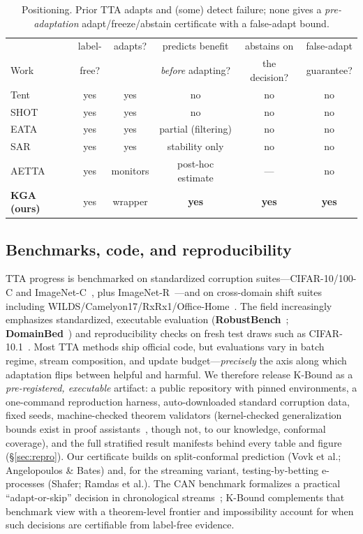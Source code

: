 \documentclass[conference]{IEEEtran}
\theoremstyle{plain}
\theoremstyle{definition}
\begin{document}
\begin{table}[t]\centering\small
{%
\begin{tabular}{lccccc}
\toprule
 & label- & adapts? & predicts benefit & abstains on & false-adapt \\
Work & free? & & \emph{before} adapting? & the decision? & guarantee? \\
\midrule
Tent & yes & yes & no & no & no \\
SHOT & yes & yes & no & no & no \\
EATA & yes & yes & partial (filtering) & no & no \\
SAR & yes & yes & stability only & no & no \\
AETTA & yes & monitors & post-hoc estimate & --- & no \\
\textbf{KGA (ours)} & yes & wrapper & \textbf{yes} & \textbf{yes} & \textbf{yes} \\
\bottomrule
\end{tabular}}
\caption{Positioning. Prior TTA adapts and (some) detect failure; none gives a
\emph{pre-adaptation} adapt/freeze/abstain certificate with a false-adapt bound.}
\label{tab:rel}
\end{table}

\subsection{Benchmarks, code, and reproducibility}
TTA progress is benchmarked on standardized corruption suites---CIFAR-10/100-C and
ImageNet-C~\cite{hendrycks2019cifar10c}, plus ImageNet-R~\cite{hendrycks2021manyfaces}---and on
cross-domain shift suites including WILDS/Camelyon17/RxRx1/Office-Home~\cite{koh2021wilds,bandi2019camelyon,taylor2019rxrx1,venkateswara2017officehome}.
The field increasingly emphasizes standardized, executable evaluation
(\textbf{RobustBench}~\cite{croce2021robustbench}; \textbf{DomainBed}~\cite{gulrajani2021domainbed}) and
reproducibility checks on fresh test draws such as CIFAR-10.1~\cite{recht2019cifar10}. Most TTA
methods ship official code, but evaluations vary in batch regime, stream composition, and update
budget---\emph{precisely} the axis along which adaptation flips between helpful and harmful. We
therefore release K-Bound as a \emph{pre-registered, executable} artifact: a public repository
with pinned environments, a one-command reproduction harness, auto-downloaded standard corruption
data, fixed seeds, machine-checked theorem validators (kernel-checked generalization bounds exist in proof assistants~\cite{zhang2025leanrademacher}, though not, to our knowledge, conformal coverage), and the full stratified result manifests
behind every table and figure (\S\ref{sec:repro}). Our certificate builds on split-conformal
prediction (Vovk et al.; Angelopoulos \& Bates) and, for the streaming variant, testing-by-betting
e-processes (Shafer; Ramdas et al.). The CAN benchmark formalizes a practical ``adapt-or-skip''
decision in chronological streams~\cite{jeon2025can}; K-Bound complements that benchmark view with
a theorem-level frontier and impossibility account for when such decisions are certifiable from
label-free evidence.
\end{document}
